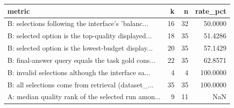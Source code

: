 \begin{tabular}{lrrr}
\toprule
                                            metric &  k &  n &  rate\_pct \\
\midrule
B: selections following the interface's 'balanc... & 16 & 32 &   50.0000 \\
B: selected option is the top-quality displayed... & 18 & 35 &   51.4286 \\
B: selected option is the lowest-budget display... & 20 & 35 &   57.1429 \\
B: final-answer query equals the task gold cons... & 22 & 35 &   62.8571 \\
B: invalid selections although the interface sa... &  4 &  4 &  100.0000 \\
B: all selections come from retrieval (dataset\_... & 35 & 35 &  100.0000 \\
A: median quality rank of the selected run amon... &  9 & 11 &       NaN \\
\bottomrule
\end{tabular}
